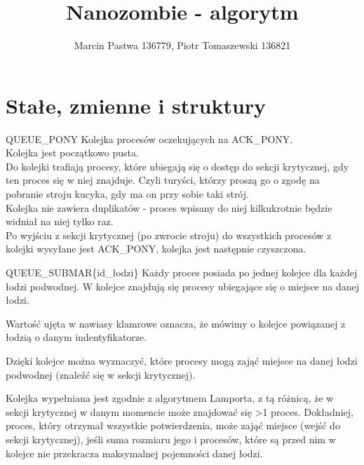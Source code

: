 \documentclass{beamer}
\title[Nanozombie]{Nanozombie - algorytm}
\author{Marcin Pastwa 136779, Piotr Tomaszewski 136821}
\date{}
\begin{document}
\begin{frame}
  \titlepage
\end{frame}

\section{Stałe, zmienne i struktury}

\begin{frame}{QUEUE\_PONY}
    \internallinenumbers
    \resetlinenumber[1]
    Kolejka procesów oczekujących na ACK\_PONY. \\
    Kolejka jest początkowo pusta. \\
    Do kolejki trafiają procesy, które ubiegają się o dostęp do sekcji krytycznej, gdy ten proces się w niej znajduje. Czyli turyści, którzy proszą go o zgodę na pobranie stroju kucyka, gdy ma on przy sobie taki strój. \\
    Kolejka nie zawiera duplikatów - proces wpisany do niej kilkukrotnie będzie widniał na niej tylko raz. \\
    Po wyjściu z sekcji krytycznej (po zwrocie stroju) do wszystkich procesów z kolejki wysyłane jest ACK\_PONY, kolejka jest następnie czyszczona.
\end{frame}

\begin{frame}{QUEUE\_SUBMAR\{id\_łodzi\}}
    \internallinenumbers
    \resetlinenumber[1]
    Każdy proces posiada po jednej kolejce dla każdej łodzi podwodnej.
    W kolejce znajdują się procesy ubiegające się o miejsce na danej łodzi.

    \vspace{0.2cm}
    Wartość ujęta w nawiasy klamrowe oznacza, że mówimy o kolejce powiązanej z łodzią o danym indentyfikatorze.

    \vspace{0.2cm}
    Dzięki kolejce można wyznaczyć, które procesy mogą zająć miejsce na danej łodzi podwodnej (znaleźć się w sekcji krytycznej).

    \vspace{0.2cm}
    Kolejka wypełniana jest zgodnie z algorytmem Lamporta, z tą różnicą, że w sekcji krytycznej w danym momencie może znajdować się >1 proces. Dokładniej, proces, który otrzymał wszystkie potwierdzenia, może zająć miejsce (wejść do sekcji krytycznej), jeśli suma rozmiaru jego i procesów, które są przed nim w kolejce nie przekracza maksymalnej pojemności danej łodzi.
\end{frame}
\end{document}
